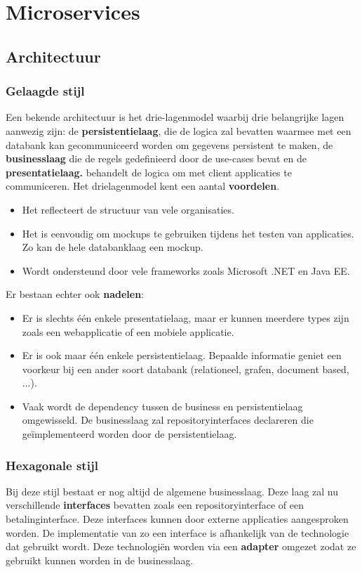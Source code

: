 \documentclass{report}
\begin{document}
	\tableofcontents
	
	\part{Microservices}
	\chapter{Architectuur}
	\section{Gelaagde stijl}
	Een bekende architectuur is het drie-lagenmodel waarbij drie belangrijke lagen aanwezig zijn: de \textbf{persistentielaag}, die de logica zal bevatten waarmee met een databank kan gecommuniceerd worden om gegevens persistent te maken, de \textbf{businesslaag} die de regels gedefinieerd  door de use-cases bevat  en de \textbf{presentatielaag.} behandelt de logica om met client applicaties te communiceren. Het drielagenmodel kent een aantal \textbf{voordelen}.
	\begin{itemize}
		\item Het reflecteert de structuur van vele organisaties.
		\item Het is eenvoudig om mockups te gebruiken tijdens het testen van applicaties. Zo kan de hele databanklaag een mockup.
		\item Wordt ondersteund door vele frameworks zoals Microsoft .NET en Java EE.
	\end{itemize}
	Er bestaan echter ook \textbf{nadelen}:
	\begin{itemize}
		\item Er is slechts één enkele presentatielaag, maar er kunnen meerdere types zijn zoals een webapplicatie of een mobiele applicatie. 
		\item Er is ook maar één enkele persistentielaag. Bepaalde informatie geniet een voorkeur bij een ander soort databank (relationeel, grafen, document based, ...).
		\item Vaak wordt de dependency tussen de business en persistentielaag omgewisseld. De businesslaag zal repositoryinterfaces declareren die geïmplementeerd worden door de persistentielaag.
	\end{itemize}
	\section{Hexagonale stijl}
	Bij deze stijl bestaat er nog altijd de algemene businesslaag. Deze laag zal nu verschillende \textbf{interfaces} bevatten zoals een repositoryinterface of een betalinginterface. Deze interfaces kunnen door externe applicaties aangesproken worden. De implementatie van zo een interface is afhankelijk van de technologie dat gebruikt wordt. Deze technologiën worden via een \textbf{adapter} omgezet zodat ze gebruikt kunnen worden in de businesslaag.
	
\end{document}
